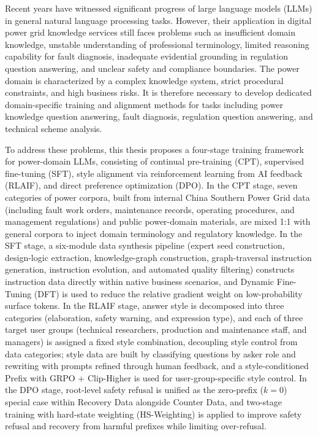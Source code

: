 \documentclass[fontset=fandol,type=master,campus=shenzhen,etitleauto=true]{hithesisbook}
\begin{document}
\begin{eabstract}
Recent years have witnessed significant progress of large language models (LLMs) in general natural language processing tasks. However, their application in digital power grid knowledge services still faces problems such as insufficient domain knowledge, unstable understanding of professional terminology, limited reasoning capability for fault diagnosis, inadequate evidential grounding in regulation question answering, and unclear safety and compliance boundaries. The power domain is characterized by a complex knowledge system, strict procedural constraints, and high business risks. It is therefore necessary to develop dedicated domain-specific training and alignment methods for tasks including power knowledge question answering, fault diagnosis, regulation question answering, and technical scheme analysis.

To address these problems, this thesis proposes a four-stage training framework for power-domain LLMs, consisting of continual pre-training (CPT), supervised fine-tuning (SFT), style alignment via reinforcement learning from AI feedback (RLAIF), and direct preference optimization (DPO). In the CPT stage, seven categories of power corpora, built from internal China Southern Power Grid data (including fault work orders, maintenance records, operating procedures, and management regulations) and public power-domain materials, are mixed 1:1 with general corpora to inject domain terminology and regulatory knowledge. In the SFT stage, a six-module data synthesis pipeline (expert seed construction, design-logic extraction, knowledge-graph construction, graph-traversal instruction generation, instruction evolution, and automated quality filtering) constructs instruction data directly within native business scenarios, and Dynamic Fine-Tuning (DFT) is used to reduce the relative gradient weight on low-probability surface tokens. In the RLAIF stage, answer style is decomposed into three categories (elaboration, safety warning, and expression type), and each of three target user groups (technical researchers, production and maintenance staff, and managers) is assigned a fixed style combination, decoupling style control from data categories; style data are built by classifying questions by asker role and rewriting with prompts refined through human feedback, and a style-conditioned Prefix with GRPO + Clip-Higher is used for user-group-specific style control. In the DPO stage, root-level safety refusal is unified as the zero-prefix ($k=0$) special case within Recovery Data alongside Counter Data, and two-stage training with hard-state weighting (HS-Weighting) is applied to improve safety refusal and recovery from harmful prefixes while limiting over-refusal.


\end{eabstract}
\end{document}
